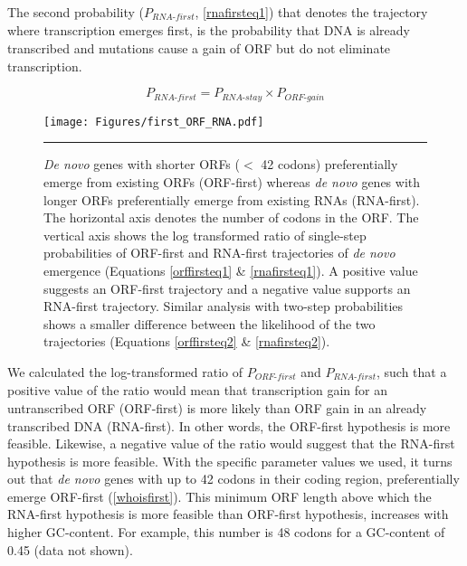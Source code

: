 \documentclass[12pt,a4paper]{article}
\begin{document}
The second probability ($P_\textit{RNA-first}$, \autoref{rnafirsteq1}) that denotes the trajectory where transcription emerges first, is the probability that DNA is already transcribed and mutations cause a gain of ORF but do not eliminate transcription. 

\begin{equation}
P_\textit{RNA-first} = P_\textit{RNA-stay}\times P_\textit{ORF-gain}
\label{rnafirsteq1}
\end{equation}

\begin{figure}[!t]
\centering
\texttt{[image: Figures/first\_ORF\_RNA.pdf]}
\caption{\textit{De novo} genes with shorter ORFs ($<$ 42 codons) preferentially emerge from existing ORFs (ORF-first) whereas \textit{de novo} genes with longer ORFs preferentially emerge from existing RNAs (RNA-first). The horizontal axis denotes the number of codons in the ORF. The vertical axis shows the log transformed ratio of single-step probabilities of ORF-first and RNA-first trajectories of \textit{de novo} emergence (Equations \ref{orffirsteq1} \& \ref{rnafirsteq1}). A positive value suggests an ORF-first trajectory and a negative value supports an RNA-first trajectory. Similar analysis with two-step probabilities shows a smaller difference between the likelihood of the two trajectories (Equations \ref{orffirsteq2} \& \ref{rnafirsteq2}).}
\label{whoisfirst}
\vspace{1ex}
\hrule
\end{figure}
We calculated the log-transformed ratio of $P_\textit{ORF-first}$ and $P_\textit{RNA-first}$, such that a positive value of the ratio would mean that transcription gain for an untranscribed ORF (ORF-first) is more likely than ORF gain in an already transcribed DNA (RNA-first). In other words, the ORF-first hypothesis is more feasible. Likewise, a negative value of the ratio would suggest that the RNA-first hypothesis is more feasible. With the specific parameter values we used, it turns out that \textit{de novo} genes with up to 42 codons in their coding region, preferentially emerge ORF-first (\autoref{whoisfirst}). This minimum ORF length above which the RNA-first hypothesis is more feasible than ORF-first hypothesis, increases with higher GC-content. For example, this number is 48 codons for a GC-content of 0.45 (data not shown).
\end{document}
